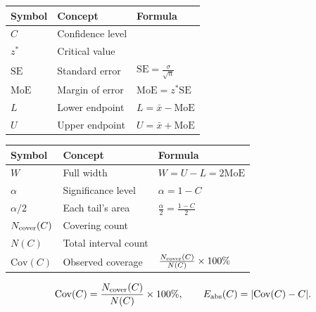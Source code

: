 \begingroup
\small
\setlength{\tabcolsep}{3pt}
\setlength{\extrarowheight}{0pt}
\setlength{\parskip}{0pt}
\renewcommand{\arraystretch}{1}
\noindent\begin{minipage}[t]{.49\linewidth}
\vspace{0pt}
\begin{tabularx}{\linewidth}{@{}>{\raggedright\arraybackslash}p{.21\linewidth}>{\raggedright\arraybackslash}p{.34\linewidth}>{\raggedright\arraybackslash}X@{}}
\toprule
\textbf{Symbol} & \textbf{Concept} & \textbf{Formula} \\
\midrule
$C$ & Confidence level & \\
$z^*$ & Critical value & \\
$\mathrm{SE}$ & Standard error & $\mathrm{SE}=\frac{\sigma}{\sqrt n}$ \\
$\mathrm{MoE}$ & Margin of error & $\mathrm{MoE}=z^*\mathrm{SE}$ \\
$L$ & Lower endpoint & $L=\bar{x}-\mathrm{MoE}$ \\
$U$ & Upper endpoint & $U=\bar{x}+\mathrm{MoE}$ \\
\bottomrule
\end{tabularx}\par
\end{minipage}\hfill
\begin{minipage}[t]{.49\linewidth}
\vspace{0pt}
\begin{tabularx}{\linewidth}{@{}>{\raggedright\arraybackslash}p{.21\linewidth}>{\raggedright\arraybackslash}p{.34\linewidth}>{\raggedright\arraybackslash}X@{}}
\toprule
\textbf{Symbol} & \textbf{Concept} & \textbf{Formula} \\
\midrule
$W$ & Full width & $W=U-L=2\mathrm{MoE}$ \\
$\alpha$ & Significance level & $\alpha=1-C$ \\
$\alpha/2$ & Each tail's area & $\frac{\alpha}{2}=\frac{1-C}{2}$ \\
$N_{\rm cover}(C)$ & Covering count & \\
$N(C)$ & Total interval count & \\
$\mathrm{Cov}(C)$ & Observed coverage & $\frac{N_{\rm cover}(C)}{N(C)}\times100\%$ \\
\bottomrule
\end{tabularx}\par
\end{minipage}\par
\endgroup
\[
\mathrm{Cov}(C)=\frac{N_{\rm cover}(C)}{N(C)}\times100\%,
\qquad
E_{\rm abs}(C)=|\mathrm{Cov}(C)-C|.
\]
